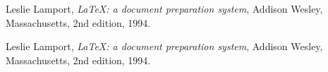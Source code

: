 \begin{thebibliography}{9}

  Leslie Lamport,
  \textit{\LaTeX: a document preparation system},
  Addison Wesley, Massachusetts,
  2nd edition,
  1994.
  
  Leslie Lamport,
  \textit{\LaTeX: a document preparation system},
  Addison Wesley, Massachusetts,
  2nd edition,
  1994.

\end{thebibliography}
